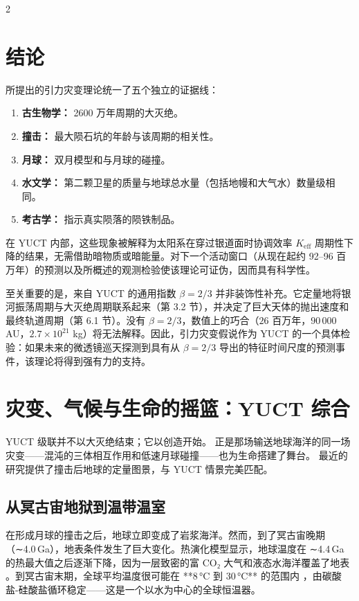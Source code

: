 \documentclass[11pt,a4paper]{article}
\begin{document}
		\begin{multicols}{2}
		
		\section{结论}
		
		所提出的引力灾变理论统一了五个独立的证据线：
		\begin{enumerate}
			\item \textbf{古生物学：} 2600 万年周期的大灭绝。
			\item \textbf{撞击：} 最大陨石坑的年龄与该周期的相关性。
			\item \textbf{月球：} 双月模型和与月球的碰撞。
			\item \textbf{水文学：} 第二颗卫星的质量与地球总水量（包括地幔和大气水）数量级相同。
			\item \textbf{考古学：} 指示真实陨落的陨铁制品。
		\end{enumerate}
		在 YUCT 内部，这些现象被解释为太阳系在穿过银道面时协调效率 \(K_{\mathrm{eff}}\) 周期性下降的结果，无需借助暗物质或暗能量。对下一个活动窗口（从现在起约 92–96 百万年）的预测以及所概述的观测检验使该理论可证伪，因而具有科学性。
		
		至关重要的是，来自 YUCT 的通用指数 $\beta = 2/3$ 并非装饰性补充。它定量地将银河振荡周期与大灭绝周期联系起来（第 3.2 节），并决定了巨大天体的抛出速度和最终轨道周期（第 6.1 节）。没有 $\beta = 2/3$，数值上的巧合（$26$ 百万年，$90\,000$ AU，$2.7\times10^{21}$ kg）将无法解释。因此，引力灾变假说作为 YUCT 的一个具体检验：如果未来的微透镜巡天探测到具有从 $\beta = 2/3$ 导出的特征时间尺度的预测事件，该理论将得到强有力的支持。
		
		\section{灾变、气候与生命的摇篮：YUCT 综合}
		
		YUCT 级联并不以大灭绝结束；它以创造开始。
		正是那场输送地球海洋的同一场灾变——混沌的三体相互作用和低速月球碰撞——也为生命搭建了舞台。
		最近的研究提供了撞击后地球的定量图景，与 YUCT 情景完美匹配。
		
		\subsection{从冥古宙地狱到温带温室}
		
		在形成月球的撞击之后，地球立即变成了岩浆海洋。然而，到了冥古宙晚期（∼4.0 Ga），地表条件发生了巨大变化。热演化模型显示，地球温度在 ∼4.4 Ga 的热最大值之后逐渐下降，因为一层致密的富 CO₂ 大气和液态水海洋覆盖了地表 \cite{Korenaga2017}。到冥古宙末期，全球平均温度很可能在 **8 °C 到 30 °C** 的范围内 \cite{Charnay2017}，由碳酸盐-硅酸盐循环稳定——这是一个以水为中心的全球恒温器。
		

\end{multicols}
\end{document}
